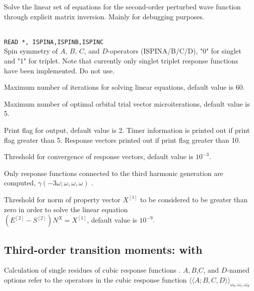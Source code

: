 \begin{description}
\item{} Solve the linear set of equations for the
  second-order perturbed wave function through explicit matrix
  inversion. Mainly for debugging purposes.

\item{}\\
\verb|READ *, ISPINA,ISPINB,ISPINC|\\
Spin symmetry of $A$, $B$, $C$, and $D$-operators (ISPINA/B/C/D),
"0" for singlet and "1" for triplet. Note that currently only singlet
triplet response functions have been implemented. Do not use.

\item{}
Maximum number of iterations for solving linear equations, default value is 60.

\item{}
Maximum number of optimal orbital trial vector microiterations,
default value is 5.

\item{}
Print flag for output, default value is 2. Timer information is printed
out if print flag greater than 5. Response vectors printed out if
print flag greater than 10.

\item{}
Threshold for convergence of response vectors, default value is $10^{-3}$.

\item{}
Only response functions connected to the third harmonic
generation are
computed, $\gamma(-3\omega;\omega,\omega,\omega)$ \cite{djpnylhajcp105}.

\item{}
Threshold for norm of property vector $X^{[1]}$ to be considered to be
greater than zero in order to solve the linear
equation \\
$\left( E^{[2]} - S^{[2]} \right)N^{X} = X^{[1]}$, default
value is $10^{-9}$.



\end{description}

\subsection{Third-order transition moments:  with }
Calculation of single residues of
cubic response functions
\cite{pndjovhacpl242,djpnhajcp105,pndjhapdkrthhkcpl253}.
$A,B$,$C$, and $D$-named options refer to the operators in the cubic
response function
$\langle\!\langle A;B,C,D \rangle\!\rangle_{\omega_b,\omega_c,\omega_d}$

